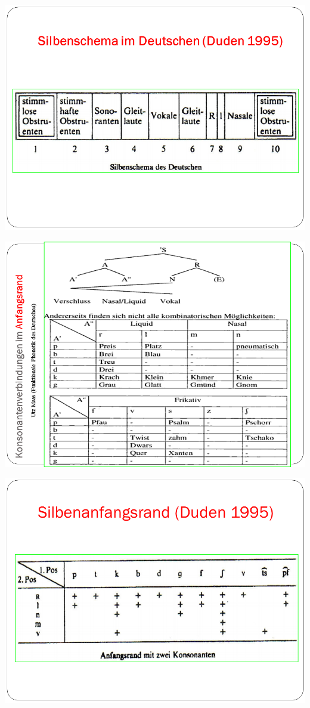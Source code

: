 \documentclass[
  letterpaper,
]{scrbook}
\begin{document}
\includegraphics[width=1\textwidth,height=\textheight]{./pictures/Wagner_Maas_Duden_Petric_42.PNG}

\includegraphics[width=1\textwidth,height=\textheight]{./pictures/Wagner_Maas_Duden_Petric_43.PNG}

\includegraphics[width=1\textwidth,height=\textheight]{./pictures/Wagner_Maas_Duden_Petric_44.PNG}
\end{document}

